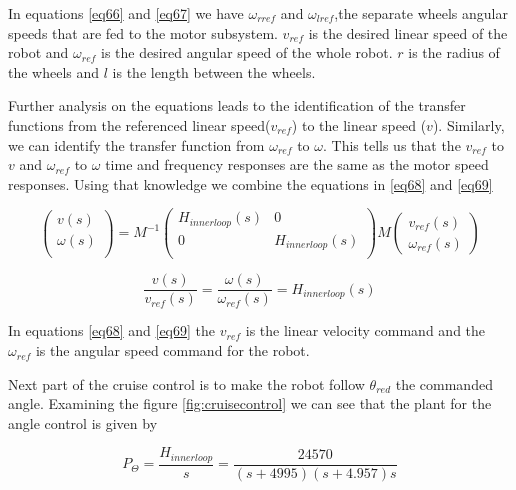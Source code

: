 In equations \ref{eq66} and \ref{eq67} we have $\omega_{rref}$ and $\omega_{lref}$,the separate wheels angular speeds that are fed to the motor subsystem. $v_{ref}$ is the desired linear speed of the robot and $\omega_{ref}$ is the desired angular speed of the whole robot. $r$ is the radius of the wheels and $l$ is the length between the wheels.

Further analysis on the equations leads to the identification of the transfer functions from the referenced linear speed($v_{ref}$) to the linear speed ($v$). Similarly, we can identify the transfer function from $\omega_{ref}$ to $\omega$. This tells us that the $v_{ref}$ to $v$ and $\omega_{ref}$ to $\omega$ time and frequency responses are the same as the motor speed responses. Using that knowledge we combine the equations in \ref{eq68} and \ref{eq69}

\begin{equation} \label{eq68}
 \begin{pmatrix} 
 v(s) \\ 
 \omega(s) \\
 \end{pmatrix} 
 =
 M^{-1}
 \begin{pmatrix}  
 H_{innerloop}(s)   & 0 \\ 
 0 & H_{innerloop}(s) \\ 
 \end{pmatrix}
 M
 \begin{pmatrix} 
 v_{ref}(s) \\ 
 \omega_{ref}(s)
 \end{pmatrix} 
 \end{equation}

\begin{equation} \label{eq69}
\frac{v(s)}{v_{ref}(s)}
=
\frac{\omega(s)}{\omega_{ref}(s)}
=
H_{innerloop}(s)
\end{equation}

In equations \ref{eq68} and \ref{eq69} the $v_{ref}$ is the linear velocity command and the $\omega_{ref}$ is the angular speed command for the robot.

Next part of the cruise control is to make the robot follow $\theta_{red}$ the commanded angle. Examining the figure \ref{fig:cruisecontrol} we can see that the plant for the angle control is given by

\begin{equation} \label{eq70}
P_{\Theta}
=
\frac{H_{innerloop}}{s}
=
\frac{24570}{(s+4995)(s+4.957)s}
\end{equation}

